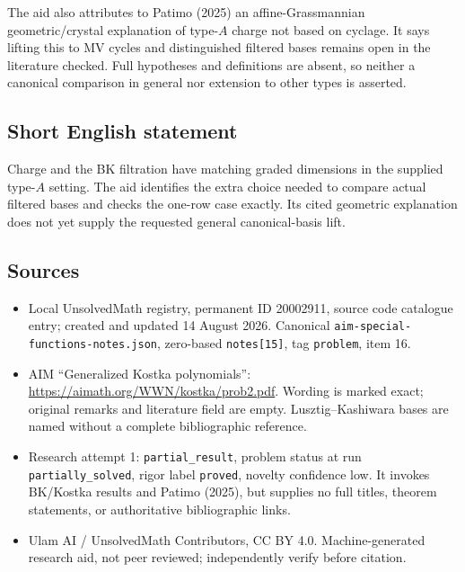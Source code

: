 \documentclass[11pt]{article}
\begin{document}
The aid also attributes to Patimo (2025) an affine-Grassmannian geometric/crystal explanation of type-$A$ charge not based on cyclage. It says lifting this to MV cycles and distinguished filtered bases remains open in the literature checked. Full hypotheses and definitions are absent, so neither a canonical comparison in general nor extension to other types is asserted.
\subsection{Short English statement}
Charge and the BK filtration have matching graded dimensions in the supplied type-$A$ setting. The aid identifies the extra choice needed to compare actual filtered bases and checks the one-row case exactly. Its cited geometric explanation does not yet supply the requested general canonical-basis lift.
\subsection{Sources}
\begin{itemize}
\item Local UnsolvedMath registry, permanent ID 20002911, source code catalogue entry; created and updated 14 August 2026. Canonical \texttt{aim-special-functions-notes.json}, zero-based \texttt{notes[15]}, tag \texttt{problem}, item 16.
\item AIM ``Generalized Kostka polynomials'': \url{https://aimath.org/WWN/kostka/prob2.pdf}. Wording is marked exact; original remarks and literature field are empty. Lusztig--Kashiwara bases are named without a complete bibliographic reference.
\item Research attempt 1: \texttt{partial\_result}, problem status at run \texttt{partially\_solved}, rigor label \texttt{proved}, novelty confidence low. It invokes BK/Kostka results and Patimo (2025), but supplies no full titles, theorem statements, or authoritative bibliographic links.
\item Ulam AI / UnsolvedMath Contributors, CC BY 4.0. Machine-generated research aid, not peer reviewed; independently verify before citation.
\end{itemize}
\end{document}
